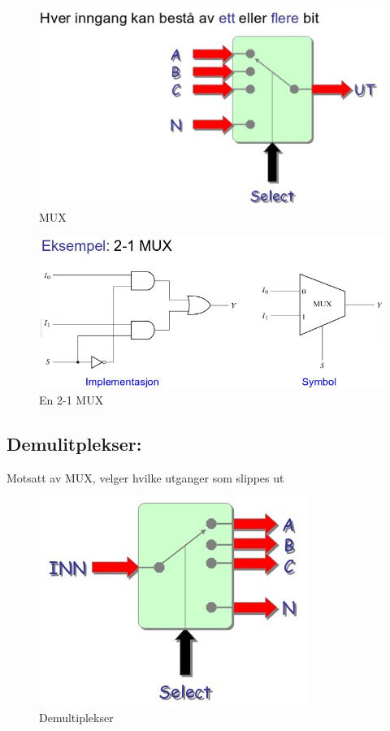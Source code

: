 \documentclass{article}
\begin{document}
	\begin{figure}[H]
		\includegraphics[scale = 0.6]{MUX.jpg}
		\caption{MUX}
	\end{figure}
	
	\begin{figure}[H]
		\includegraphics[scale = 0.6]{MUX2.jpg}
		\caption{En 2-1 MUX}
	\end{figure}
	
	
	\subsection{Demulitplekser:}
	Motsatt av MUX, velger hvilke utganger som slippes ut
	
	\begin{figure}[H]
		\includegraphics[scale = 0.6]{DEMUX.jpg}
		\caption{Demultiplekser}
	\end{figure}
	
\end{document}
